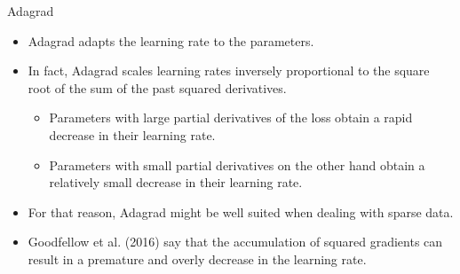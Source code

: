 \documentclass[11pt,compress,t,notes=noshow, xcolor=table]{beamer}
\begin{document}
\begin{vbframe}{Adagrad}
  \begin{itemize}
    \item Adagrad adapts the learning rate to the parameters.
    \item In fact, Adagrad scales learning rates inversely proportional to the square root of the sum of the past squared derivatives.
      \begin{itemize}
        \item Parameters with large partial derivatives of the loss obtain a rapid decrease in their learning rate.
        \item Parameters with small partial derivatives on the other hand obtain a relatively small decrease in their learning rate.
      \end{itemize}
    \item For that reason, Adagrad might be well suited when dealing with sparse data. 
    \item Goodfellow et al. (2016) say that the accumulation of squared gradients can result in a premature and overly decrease in the learning rate.
  \end{itemize}
  
\framebreak
  

\end{vbframe}
\end{document}
